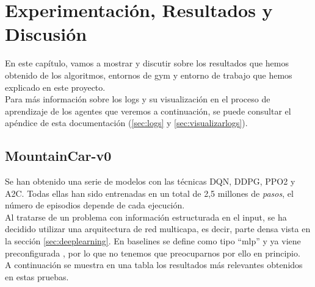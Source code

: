 \documentclass[11pt,fleqn]{book} %
\begin{document}
\chapter{Experimentación, Resultados y Discusión}

En este capítulo, vamos a mostrar y discutir sobre los resultados que hemos obtenido de los algoritmos, entornos de gym y entorno de trabajo que hemos explicado en este proyecto. \\

Para más información sobre los logs y su visualización en el proceso de aprendizaje de los agentes que veremos a continuación, se puede consultar el apéndice de esta documentación (\ref{sec:logs} y \ref{sec:visualizarlogs}).

\section{MountainCar-v0}\label{expmountaincar}

Se han obtenido una serie de modelos con las técnicas DQN, DDPG, PPO2 y A2C. Todas ellas han sido entrenadas en un total de 2,5 millones de \textit{pasos}, el número de episodios depende de cada ejecución. \\

Al tratarse de un problema con información estructurada en el input, se ha decidido utilizar una arquitectura de red multicapa, es decir, parte densa vista en la sección \ref{sec:deeplearning}. En baselines se define como tipo ``mlp'' y ya viene preconfigurada \cite{article:redesbaselines}, por lo que no tenemos que preocuparnos por ello en principio. \\

A continuación se muestra en una tabla los resultados más relevantes obtenidos en estas pruebas.
\end{document}

